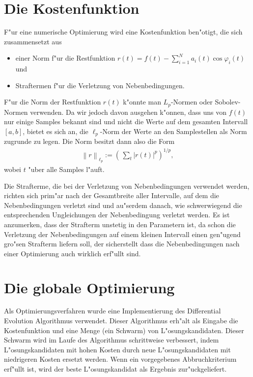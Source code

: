 \documentclass[a4paper]{scrartcl}
\newcommand{\norm}[1]{{\left\lVert#1\right\rVert}}
\newcommand{\pphi}{{\varphi}}
\begin{document}
\section{Die Kostenfunktion}

F"ur eine numerische Optimierung wird eine Kostenfunktion ben"otigt, die sich zusammensetzt aus
\begin{itemize}
 \item einer Norm f"ur die Restfunktion $r(t) = f(t) - \sum_{i=1}^N a_i(t)\cos\pphi_i(t)$ und
 \item Straftermen f"ur die Verletzung von Nebenbedingungen. 
\end{itemize}
F"ur die Norm der Restfunktion $r(t)$ k"onnte man $L_p$-Normen oder Sobolev-Normen verwenden. 
Da wir jedoch davon ausgehen k"onnen, dass uns von $f(t)$ nur einige Samples bekannt sind und nicht die Werte auf dem gesamten Intervall $[a,b]$, bietet es sich an, die $\ell_p$-Norm der Werte an den Samplestellen als Norm zugrunde zu legen. 
Die Norm besitzt dann also die Form
\begin{align} \label{eq:lpnormr}
\norm{r}_{\ell_p} := \left(\,\sum_{t}\lvert r(t)\rvert^p\right)^{1/p},
\end{align}
wobei $t$ "uber alle Samples l"auft. 

Die Strafterme, die bei der Verletzung von Nebenbedingungen verwendet werden, richten sich prim"ar nach der Gesamtbreite aller Intervalle, auf dem die Nebenbedingungen verletzt sind und au"serdem danach, wie schwerwiegend die entsprechenden Ungleichungen der Nebenbedingung verletzt werden. 
Es ist anzumerken, dass der Strafterm unstetig in den Parametern ist, da schon die Verletzung der Nebenbedingungen auf einem kleinen Intervall einen gen"ugend gro"sen Strafterm liefern soll, der sicherstellt dass die Nebenbedingungen nach einer Optimierung auch wirklich erf"ullt sind. 


\section{Die globale Optimierung}

Als Optimierungsverfahren wurde eine Implementierung des Differential Evolution Algorithmus verwendet. 
Dieser Algorithmus erh"alt als Eingabe die Kostenfunktion und eine Menge (ein Schwarm) von L"osungskandidaten. 
Dieser Schwarm wird im Laufe des Algorithmus schrittweise verbessert, indem L"osungskandidaten mit hohen Kosten durch neue L"osungskandidaten mit niedrigeren Kosten ersetzt werden. 
Wenn ein vorgegebenes Abbruchkriterium erf"ullt ist, wird der beste L"osungskandidat als Ergebnis zur"uckgeliefert. 
\end{document}
